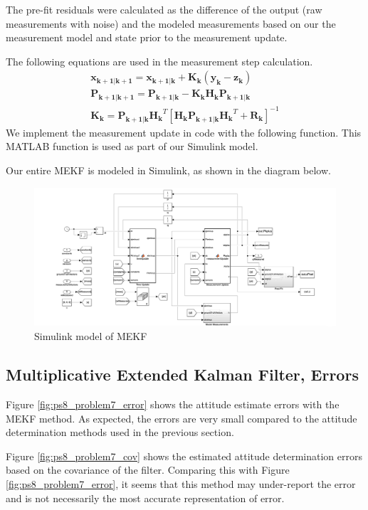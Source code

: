The pre-fit residuals were calculated as the difference of the output (raw measurements with noise) and the modeled measurements based on our the measurement model and state prior to the measurement update.

The following equations are used in the measurement step calculation.
\begin{align*}
    \mathbf{x_{k+1 | k+1}} = \mathbf{x_{k+1 | k}} + \mathbf{K_k}
    (\mathbf{y_k} - \mathbf{z_k}) \\
    \mathbf{P_{k+1 | k+1}} = \mathbf{P_{k+1 | k}} - 
    \mathbf{K_k} \mathbf{H_k} \mathbf{P_{k+1 | k}} \\
    \mathbf{K_k} = \mathbf{P_{k+1 | k}} \mathbf{H_k}^T [\mathbf{H_k} \mathbf{P_{k+1 | k}} \mathbf{H_k}^T + \mathbf{R_k}]^{-1}
\end{align*}
We implement the measurement update in code with the following function. This MATLAB function is used as part of our Simulink model.



Our entire MEKF is modeled in Simulink, as shown in the diagram below.

\begin{figure}[H]
\centering
\includegraphics[scale=0.27]{Images/ps8_problem5_simulink.png}
\caption{Simulink model of MEKF}
\label{fig:ps8_problem5_simulink}
\end{figure}

\subsection{Multiplicative Extended Kalman Filter, Errors}
Figure \ref{fig:ps8_problem7_error} shows the attitude estimate errors with the MEKF method. As expected, the errors are very small compared to the attitude determination methods used in the previous section.

Figure \ref{fig:ps8_problem7_cov} shows the estimated attitude determination errors based on the covariance of the filter. Comparing this with Figure \ref{fig:ps8_problem7_error}, it seems that this method may under-report the error and is not necessarily the most accurate representation of error.

